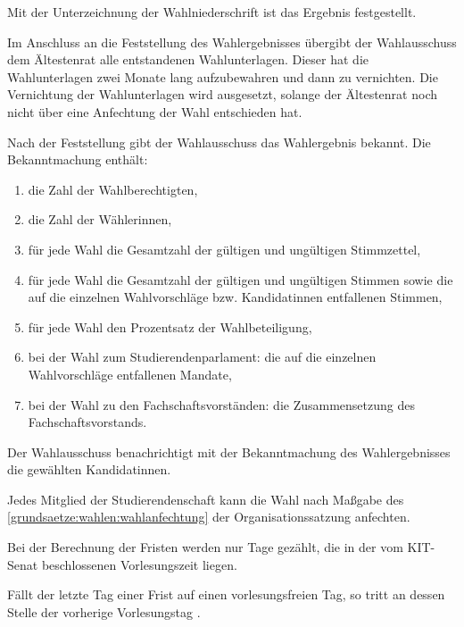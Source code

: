 Mit der Unterzeichnung der Wahlniederschrift ist das Ergebnis festgestellt.

Im Anschluss an die Feststellung des Wahlergebnisses übergibt der Wahlausschuss dem Ältestenrat alle entstandenen Wahlunterlagen. Dieser hat die Wahlunterlagen zwei Monate lang aufzubewahren und dann zu vernichten. Die Vernichtung der Wahlunterlagen wird ausgesetzt, solange der Ältestenrat noch nicht über eine Anfechtung der Wahl entschieden hat.

\label{wahl:ergebnis}
Nach der Feststellung gibt der Wahlausschuss das Wahlergebnis bekannt. Die Bekanntmachung enthält: 
\begin{enumerate}
    \item die Zahl der Wahlberechtigten,
    \item die Zahl der Wählerinnen,
    \item für jede Wahl die Gesamtzahl der gültigen und ungültigen Stimmzettel,
    \item für jede Wahl die Gesamtzahl der gültigen und ungültigen Stimmen sowie die auf die einzelnen Wahlvorschläge bzw. Kandidatinnen entfallenen Stimmen,
    \item für jede Wahl den Prozentsatz der Wahlbeteiligung,
    \item bei der Wahl zum Studierendenparlament: die auf die einzelnen Wahlvorschläge entfallenen Mandate,
    \item bei der Wahl zu den Fachschaftsvorständen: die Zusammensetzung des Fachschaftsvorstands.
\end{enumerate}

Der Wahlausschuss benachrichtigt mit der Bekanntmachung des Wahlergebnisses die gewählten Kandidatinnen. 

\label{wahl:wahlanfechtung}
\parnumberfalse Jedes Mitglied der Studierendenschaft kann die Wahl nach Maßgabe des \ref{grundsaetze:wahlen:wahlanfechtung} der Organisationssatzung anfechten.\parnumbertrue

\label{wahl:fristen}
Bei der Berechnung der Fristen werden nur Tage gezählt, die in der vom KIT-Senat beschlossenen Vorlesungszeit liegen.

Fällt der letzte Tag einer Frist auf einen vorlesungsfreien Tag, so tritt an dessen Stelle der vorherige Vorlesungstag .

